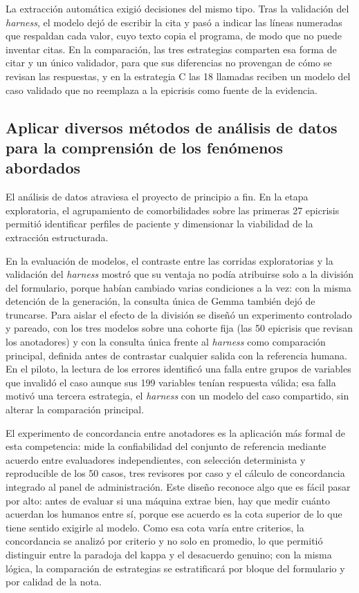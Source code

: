 \documentclass[12pt,letterpaper]{article}
\begin{document}
La extracción automática exigió decisiones del mismo tipo. Tras la validación del \textit{harness}, el modelo dejó de escribir la cita y pasó a indicar las líneas numeradas que respaldan cada valor, cuyo texto copia el programa, de modo que no puede inventar citas. En la comparación, las tres estrategias comparten esa forma de citar y un único validador, para que sus diferencias no provengan de cómo se revisan las respuestas, y en la estrategia C las 18 llamadas reciben un modelo del caso validado que no reemplaza a la epicrisis como fuente de la evidencia.

\subsection*{Aplicar diversos métodos de análisis de datos para la comprensión de los fenómenos abordados}

El análisis de datos atraviesa el proyecto de principio a fin. En la etapa exploratoria, el agrupamiento de comorbilidades sobre las primeras 27 epicrisis permitió identificar perfiles de paciente y dimensionar la viabilidad de la extracción estructurada.

En la evaluación de modelos, el contraste entre las corridas exploratorias y la validación del \textit{harness} mostró que su ventaja no podía atribuirse solo a la división del formulario, porque habían cambiado varias condiciones a la vez: con la misma detención de la generación, la consulta única de Gemma también dejó de truncarse. Para aislar el efecto de la división se diseñó un experimento controlado y pareado, con los tres modelos sobre una cohorte fija (las 50 epicrisis que revisan los anotadores) y con la consulta única frente al \textit{harness} como comparación principal, definida antes de contrastar cualquier salida con la referencia humana. En el piloto, la lectura de los errores identificó una falla entre grupos de variables que invalidó el caso aunque sus 199 variables tenían respuesta válida; esa falla motivó una tercera estrategia, el \textit{harness} con un modelo del caso compartido, sin alterar la comparación principal.

El experimento de concordancia entre anotadores es la aplicación más formal de esta competencia: mide la confiabilidad del conjunto de referencia mediante acuerdo entre evaluadores independientes, con selección determinista y reproducible de los 50 casos, tres revisores por caso y el cálculo de concordancia integrado al panel de administración. Este diseño reconoce algo que es fácil pasar por alto: antes de evaluar si una máquina extrae bien, hay que medir cuánto acuerdan los humanos entre sí, porque ese acuerdo es la cota superior de lo que tiene sentido exigirle al modelo. Como esa cota varía entre criterios, la concordancia se analizó por criterio y no solo en promedio, lo que permitió distinguir entre la paradoja del kappa y el desacuerdo genuino; con la misma lógica, la comparación de estrategias se estratificará por bloque del formulario y por calidad de la nota.
\end{document}
